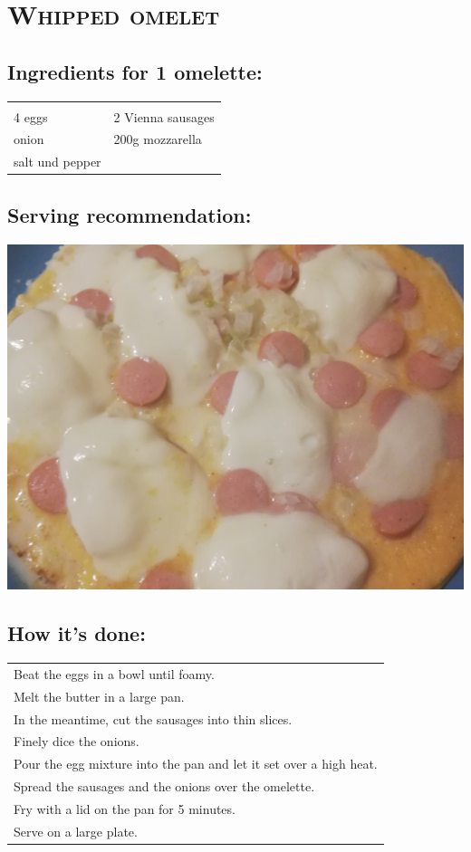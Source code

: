 \section{\textsc{Whipped omelet}}

\subsection*{Ingredients for 1 omelette:}

\begin{tabular}{p{7.5cm} p{7.5cm}}
	& \\
	4 eggs & 2 Vienna sausages \\
	\sfrac{1}{2} onion & 200g mozzarella \\
	salt und pepper &
\end{tabular}

\subsection*{Serving recommendation:}

\includegraphics[width=\textwidth]{img/omlett/omlett_wiener_fertig.jpg} \cite{omlettwiener}

\subsection*{How it's done:}

\begin{tabular}{p{15cm}}
  \\
  Beat the eggs in a bowl until foamy.\\
  Melt the butter in a large pan.\\
  In the meantime, cut the sausages into thin slices.\\
  Finely dice the onions.\\
  Pour the egg mixture into the pan and let it set over a high heat.\\
  Spread the sausages and the onions over the omelette.\\
  Fry with a lid on the pan for 5 minutes.\\
  Serve on a large plate.
\end{tabular}
